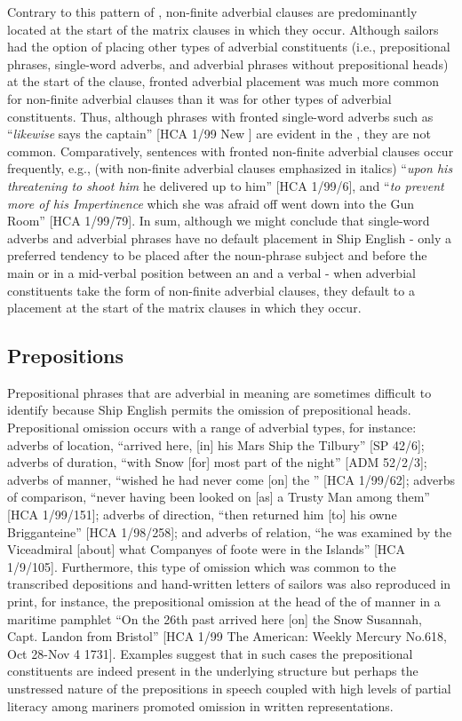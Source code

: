 Contrary to this pattern of , non-finite adverbial clauses are predominantly located at the start of the matrix clauses in which they occur. Although sailors had the option of placing other types of adverbial constituents (i.e., prepositional phrases, single-word adverbs, and adverbial phrases without prepositional heads) at the start of the clause, fronted adverbial placement was much more common for non-finite adverbial clauses than it was for other types of adverbial constituents. Thus, although phrases with fronted single-word adverbs such as “\textit{likewise} says the captain” [HCA 1/99 New \citealt{Providence1722}] are evident in the , they are not common. Comparatively, sentences with fronted non-finite adverbial clauses occur frequently, e.g., (with non-finite adverbial clauses emphasized in italics) “\textit{upon his threatening to shoot him} he delivered up to him” [HCA 1/99/6], and “\textit{to prevent more of his Impertinence} which she was afraid off went down into the Gun Room” [HCA 1/99/79]. In sum, although we might conclude that single-word adverbs and adverbial phrases have no default placement in Ship English - only a preferred tendency to be placed after the noun-phrase subject and before the main  or in a mid-verbal position between an  and a verbal  - when adverbial constituents take the form of non-finite adverbial clauses, they default to a placement at the start of the matrix clauses in which they occur. 

\subsection{{Prepositions} }%

Prepositional phrases that are adverbial in meaning are sometimes difficult to identify because Ship English permits the omission of prepositional heads. Prepositional omission occurs with a range of adverbial types, for instance: adverbs of location, “arrived here, [in] his Mars Ship the Tilbury” [SP 42/6]; adverbs of duration, “with Snow [for] most part of the night” [ADM 52/2/3]; adverbs of manner, “wished he had never come [on] the ” [HCA 1/99/62]; adverbs of comparison, “never having been looked on [as] a Trusty Man among them” [HCA 1/99/151]; adverbs of direction, “then returned him [to] his owne Brigganteine” [HCA 1/98/258]; and adverbs of relation, “he was examined by the Viceadmiral [about] what Companyes of foote were in the Islands” [HCA 1/9/105]. Furthermore, this type of omission which was common to the transcribed depositions and hand-written letters of sailors was also reproduced in print, for instance, the prepositional omission at the head of the  of manner in a maritime pamphlet “On the 26th past arrived here [on] the Snow Susannah, Capt. Landon from Bristol” [HCA 1/99 The American: Weekly Mercury No.618, Oct 28-Nov 4 1731]. Examples suggest that in such cases the prepositional constituents are indeed present in the underlying structure but perhaps the unstressed nature of the prepositions in speech coupled with high levels of partial literacy among mariners promoted omission in written representations. 

